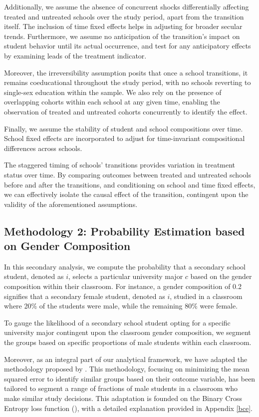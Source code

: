 Additionally, we assume the absence of concurrent shocks differentially affecting treated and untreated schools over the study period, apart from the transition itself. The inclusion of time fixed effects helps in adjusting for broader secular trends. Furthermore, we assume no anticipation of the transition's impact on student behavior until its actual occurrence, and test for any anticipatory effects by examining leads of the treatment indicator.

Moreover, the irreversibility assumption posits that once a school transitions, it remains coeducational throughout the study period, with no schools reverting to single-sex education within the sample. We also rely on the presence of overlapping cohorts within each school at any given time, enabling the observation of treated and untreated cohorts concurrently to identify the effect.

Finally, we assume the stability of student and school compositions over time. School fixed effects are incorporated to adjust for time-invariant compositional differences across schools.

The staggered timing of schools' transitions provides variation in treatment status over time. By comparing outcomes between treated and untreated schools before and after the transitions, and conditioning on school and time fixed effects, we can effectively isolate the causal effect of the transition, contingent upon the validity of the aforementioned assumptions.

\subsection{Methodology 2: Probability Estimation based on Gender Composition}

In this secondary analysis, we compute the probability that a secondary school student, denoted as $i$, selects a particular university major $c$ based on the gender composition within their classroom. For instance, a gender composition of 0.2 signifies that a secondary female student, denoted as $i$, studied in a classroom where 20\% of the students were male, while the remaining 80\% were female.

To gauge the likelihood of a secondary school student opting for a specific university major contingent upon the classroom gender composition, we segment the groups based on specific proportions of male students within each classroom.

Moreover, as an integral part of our analytical framework, we have adapted the methodology proposed by \citet{IMBENS2012}. This methodology, focusing on minimizing the mean squared error to identify similar groups based on their outcome variable, has been tailored to segment a range of fractions of male students in a classroom who make similar study decisions. This adaptation is founded on the Binary Cross Entropy loss function (\citet{Mao2023}), with a detailed explanation provided in Appendix \ref{bce}.

